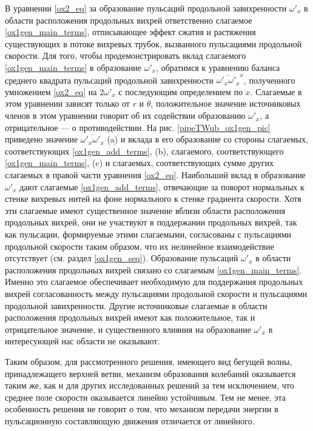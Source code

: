 В уравнении \eqref{ox2_eq} за образование пульсаций продольной завихренности $\omega'_x$ в области расположения продольных вихрей ответственно слагаемое \eqref{ox1gen_main_terms}, отписывающее эффект сжатия и растяжения существующих в потоке вихревых трубок, вызванного пульсациями продольной скорости. Для того, чтобы продемонстрировать вклад слагаемого \eqref{ox1gen_main_terms} в образование $\omega'_x$, обратимся к уравнению баланса среднего квадрата пульсаций продольной завихренности $\overline{\omega'_x\omega'_x}^x$, полученного умножением \eqref{ox2_eq} на $2\omega'_x$ с последующим определением по $x$. Слагаемые в этом уравнении зависят только от $r$ и $\theta$, положительное значение источниковых членов в этом уравнении говорит об их содействии образованию $\omega'_x$, а отрицательное --- о противодействии. На рис. \ref{pipeTWub_ox1gen_pic} приведено значение $\overline{\omega'_x\omega'_x}$ (a) и вклада в его образование со стороны слагаемых, соответствующих \eqref{ox1gen_add_terms}, (b), слагаемого, соответствующего \eqref{ox1gen_main_terms}, (c) и слагаемых, соответствующих сумме других слагаемых в правой части уравнения \eqref{ox2_eq}. Наибольший вклад в образование $\omega'_x$ дают слагаемые \eqref{ox1gen_add_terms}, отвечающие за поворот нормальных к стенке вихревых нитей на фоне нормального к стенке градиента скорости. Хотя эти слагаемые имеют существенное значение вблизи области расположения продольных вихрей, они не участвуют в поддержании продольных вихрей, так как пульсации, формируемые этими слагаемыми, согласованы с пульсациями продольной скорости таким образом, что их нелинейное взаимодействие отсутствует (см. раздел \ref{ox1gen_seq}). Образование пульсаций $\omega'_x$ в области расположения продольных вихрей связано со слагаемым \eqref{ox1gen_main_terms}. Именно это слагаемое обеспечивает необходимую для поддержания продольных вихрей согласованность между пульсациями продольной скорости и пульсациями продольной завихренности. Другие источниковые слагаемые в области расположения продольных вихрей имеют как положительное, так и отрицательное значение, и существенного влияния на образование $\omega'_x$ в интересующей нас области не оказывают. 

Таким образом, для рассмотренного решения, имеющего вид бегущей волны, принадлежащего верхней ветви, механизм образования колебаний оказывается таким же, как и для других исследованных решений за тем исключением, что среднее поле скорости оказывается линейно устойчивым. Тем не менее, эта особенность решения не говорит о том, что механизм передачи энергии в пульсационную составляющую движения отличается от линейного. 



